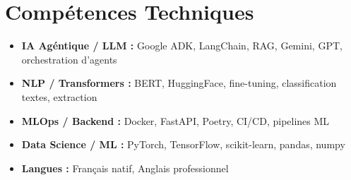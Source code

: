 \documentclass[a4paper,11pt]{article}
\begin{document}
\section{Comp\'etences Techniques}
\begin{itemize}[leftmargin=0.5cm, nosep]
    \item \textbf{IA Ag\'entique / LLM :} Google ADK, LangChain, RAG, Gemini, GPT, orchestration d'agents
    \item \textbf{NLP / Transformers :} BERT, HuggingFace, fine-tuning, classification textes, extraction
    \item \textbf{MLOps / Backend :} Docker, FastAPI, Poetry, CI/CD, pipelines ML
    \item \textbf{Data Science / ML :} PyTorch, TensorFlow, scikit-learn, pandas, numpy
    \item \textbf{Langues :} Fran\c{c}ais natif, Anglais professionnel
\end{itemize}
\end{document}
